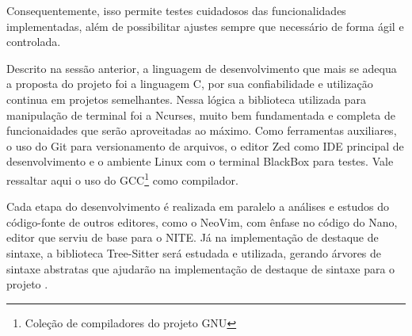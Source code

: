 Consequentemente, isso permite testes cuidadosos das funcionalidades implementadas,
além de possibilitar ajustes sempre que necessário de forma ágil e controlada.

Descrito na sessão anterior, a linguagem de desenvolvimento que mais se adequa a
proposta do projeto foi a linguagem C, por sua confiabilidade e utilização
continua em projetos semelhantes. Nessa lógica a biblioteca utilizada para manipulação
de terminal foi a Ncurses, muito bem fundamentada e completa de funcionaidades
que serão aproveitadas ao máximo. Como ferramentas auxiliares, o uso do Git para
versionamento de arquivos, o editor Zed como IDE principal de desenvolvimento e o
ambiente Linux com o terminal BlackBox para testes. Vale ressaltar aqui o uso do
GCC\footnote{Coleção de compiladores do projeto GNU} como compilador.

Cada etapa do desenvolvimento é realizada em paralelo a análises e estudos do código-fonte
de outros editores, como o NeoVim, com ênfase no código do Nano, editor que
serviu de base para o NITE. Já na implementação de destaque de sintaxe, a
biblioteca Tree-Sitter será estudada e utilizada, gerando árvores de sintaxe abstratas
que ajudarão na implementação de destaque de sintaxe para o projeto \cite{tree-sitter}.